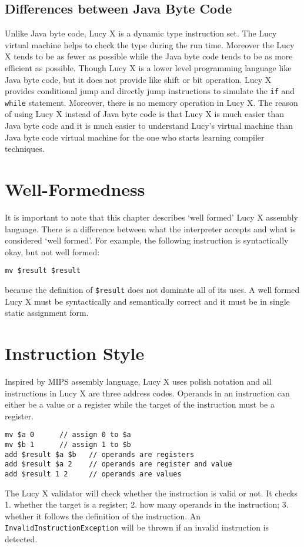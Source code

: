 \subsection{Differences between Java Byte Code}
Unlike Java byte code, Lucy X is a dynamic type instruction set. The Lucy virtual machine helps to check the type during the run time. Moreover the Lucy X tends to be as fewer as possible while the Java byte code tends to be as more efficient as possible. Though Lucy X is a lower level programming language like Java byte code, but it does not provide like shift or bit operation. Lucy X provides conditional jump and directly jump instructions to simulate the \texttt{if} and \texttt{while} statement. Moreover, there is no memory operation in Lucy X. The reason of using Lucy X instead of Java byte code is that Lucy X is much easier than Java byte code and it is much easier to understand Lucy's virtual machine than Java byte code virtual machine for the one who starts learning compiler techniques.


\section{Well-Formedness}
It is important to note that this chapter describes ‘well formed’ Lucy X assembly language. There is a difference between what the interpreter accepts and what is considered ‘well formed’. For example, the following instruction is syntactically okay, but not well formed:
\begin{lstlisting}[language=LucyX]
mv $result $result
\end{lstlisting}
because the definition of \texttt{\$result} does not dominate all of its uses. A well formed Lucy X must be syntactically and semantically correct and it must be in single static assignment form.


\section{Instruction Style}
Inspired by MIPS assembly language, Lucy X uses polish notation and all instructions in Lucy X are three address codes. Operands in an instruction can either be a value or a register while the target of the instruction must be a register.
\begin{lstlisting}[language=LucyX]
mv $a 0      // assign 0 to $a
mv $b 1      // assign 1 to $b
add $result $a $b   // operands are registers
add $result $a 2    // operands are register and value
add $result 1 2     // operands are values
\end{lstlisting}
The Lucy X validator will check whether the instruction is valid or not. It checks 1. whether the target is a register; 2. how many operands in the instruction; 3. whether it follows the definition of the instruction. An \texttt{InvalidInstructionException} will be thrown if an invalid instruction is detected.


